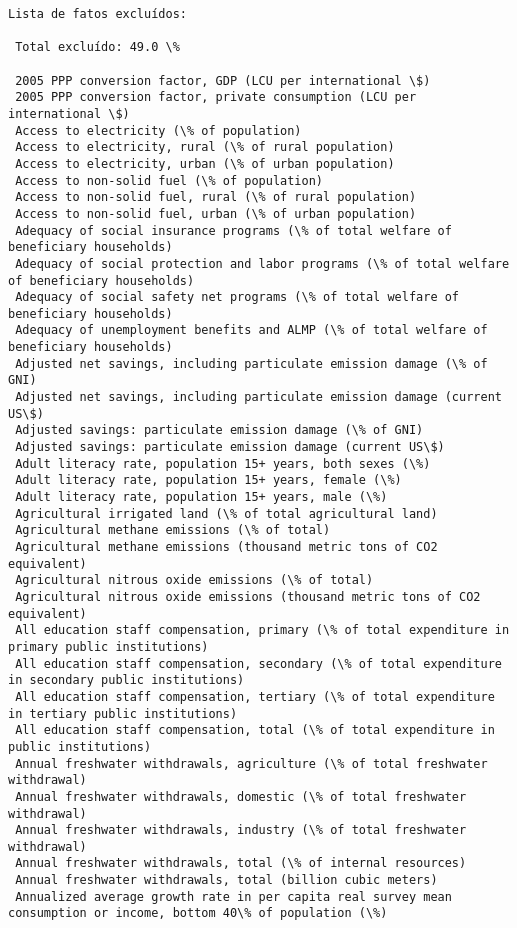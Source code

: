 \documentclass[11pt]{article}
\begin{document}
    \begin{Verbatim}[commandchars=\\\{\}]
Lista de fatos excluídos:

 Total excluído: 49.0 \%

 2005 PPP conversion factor, GDP (LCU per international \$)
 2005 PPP conversion factor, private consumption (LCU per international \$)
 Access to electricity (\% of population)
 Access to electricity, rural (\% of rural population)
 Access to electricity, urban (\% of urban population)
 Access to non-solid fuel (\% of population)
 Access to non-solid fuel, rural (\% of rural population)
 Access to non-solid fuel, urban (\% of urban population)
 Adequacy of social insurance programs (\% of total welfare of beneficiary households)
 Adequacy of social protection and labor programs (\% of total welfare of beneficiary households)
 Adequacy of social safety net programs (\% of total welfare of beneficiary households)
 Adequacy of unemployment benefits and ALMP (\% of total welfare of beneficiary households)
 Adjusted net savings, including particulate emission damage (\% of GNI)
 Adjusted net savings, including particulate emission damage (current US\$)
 Adjusted savings: particulate emission damage (\% of GNI)
 Adjusted savings: particulate emission damage (current US\$)
 Adult literacy rate, population 15+ years, both sexes (\%)
 Adult literacy rate, population 15+ years, female (\%)
 Adult literacy rate, population 15+ years, male (\%)
 Agricultural irrigated land (\% of total agricultural land)
 Agricultural methane emissions (\% of total)
 Agricultural methane emissions (thousand metric tons of CO2 equivalent)
 Agricultural nitrous oxide emissions (\% of total)
 Agricultural nitrous oxide emissions (thousand metric tons of CO2 equivalent)
 All education staff compensation, primary (\% of total expenditure in primary public institutions)
 All education staff compensation, secondary (\% of total expenditure in secondary public institutions)
 All education staff compensation, tertiary (\% of total expenditure in tertiary public institutions)
 All education staff compensation, total (\% of total expenditure in public institutions)
 Annual freshwater withdrawals, agriculture (\% of total freshwater withdrawal)
 Annual freshwater withdrawals, domestic (\% of total freshwater withdrawal)
 Annual freshwater withdrawals, industry (\% of total freshwater withdrawal)
 Annual freshwater withdrawals, total (\% of internal resources)
 Annual freshwater withdrawals, total (billion cubic meters)
 Annualized average growth rate in per capita real survey mean consumption or income, bottom 40\% of population (\%)

\end{Verbatim}
\end{document}
